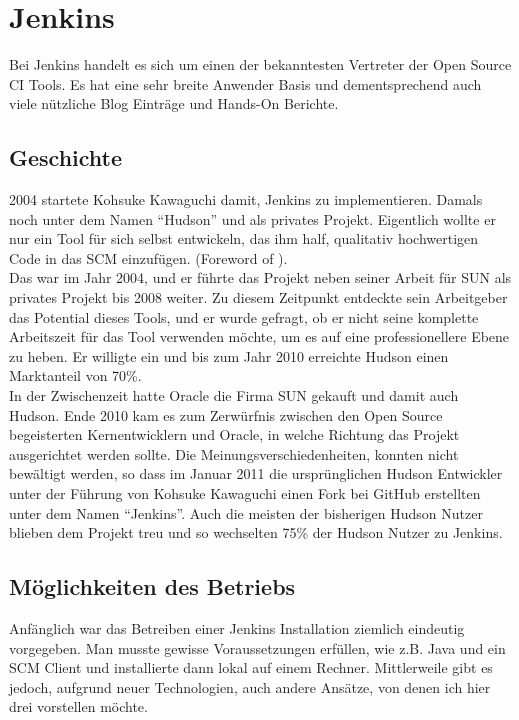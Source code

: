 \pagebreak

\chapter{Jenkins}
Bei Jenkins handelt es sich um einen der bekanntesten Vertreter der Open Source CI Tools. Es hat eine sehr breite Anwender Basis und dementsprechend auch viele nützliche Blog Einträge und Hands-On Berichte.
\section{Geschichte}
2004 startete Kohsuke Kawaguchi damit, Jenkins zu implementieren. Damals noch unter dem Namen "`Hudson"' und als privates Projekt. Eigentlich wollte er nur ein Tool für sich selbst entwickeln, das ihm half, qualitativ hochwertigen Code in das SCM einzufügen. (Foreword of \cite{smart2011jenkins}).\\
Das war im Jahr 2004, und er führte das Projekt neben seiner Arbeit für SUN als privates Projekt bis 2008 weiter. Zu diesem Zeitpunkt entdeckte sein Arbeitgeber das Potential dieses Tools, und er wurde gefragt, ob er nicht seine komplette Arbeitszeit für das Tool verwenden möchte, um es auf eine professionellere Ebene zu heben. Er willigte ein und bis zum Jahr 2010 erreichte Hudson einen Marktanteil von 70\%.\cite[3]{smart2011jenkins}\\
In der Zwischenzeit hatte Oracle die Firma SUN gekauft und damit auch Hudson. Ende 2010 kam es zum Zerwürfnis zwischen den Open Source begeisterten Kernentwicklern und Oracle, in welche Richtung das Projekt ausgerichtet werden sollte. Die Meinungsverschiedenheiten, konnten nicht bewältigt werden, so dass im Januar 2011 die ursprünglichen Hudson Entwickler unter der Führung von Kohsuke Kawaguchi einen Fork bei GitHub erstellten unter dem Namen "`Jenkins"'. Auch die meisten der bisherigen Hudson Nutzer blieben dem Projekt treu und so wechselten 75\% der Hudson Nutzer zu Jenkins. \cite[3-4]{smart2011jenkins}
\section{Möglichkeiten des Betriebs}
Anfänglich war das Betreiben einer Jenkins Installation ziemlich eindeutig vorgegeben. Man musste gewisse Voraussetzungen erfüllen, wie z.B. Java und ein SCM Client und installierte dann lokal auf einem Rechner. Mittlerweile gibt es jedoch, aufgrund neuer Technologien, auch andere Ansätze, von denen ich hier drei vorstellen möchte.
